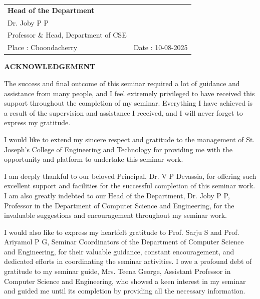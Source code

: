 \begin{tabular*}{\textwidth}{@{\extracolsep{\fill}} ll}
\textbf{Head of the Department} & \\
Dr. Joby P P & \\
Professor \& Head, Department of CSE & \\
Place : Choondacherry & Date : 10-08-2025
\end{tabular*}

\newpage
\thispagestyle{empty}
\begin{center}
  \vspace*{1cm}
  \textbf{\large ACKNOWLEDGEMENT}
\end{center}
The success and final outcome of this seminar required a lot of guidance and assistance from
many people, and I feel extremely privileged to have received this support throughout the
completion of my seminar. Everything I have achieved is a result of the supervision and
assistance I received, and I will never forget to express my gratitude.

\vspace{-0.3cm}

I would like to extend my sincere respect and gratitude to the management of St. Joseph’s
College of Engineering and Technology for providing me with the opportunity and platform
to undertake this seminar work.

\vspace{-0.3cm}

I am deeply thankful to our beloved Principal, Dr. V P Devassia, for offering such excellent
support and facilities for the successful completion of this seminar work.
I am also greatly indebted to our Head of the Department, Dr. Joby P P, Professor in the Department of Computer Science and Engineering, for the invaluable suggestions and encouragement throughout my seminar work.

\vspace{-0.3cm}

I would also like to express my heartfelt gratitude to Prof. Sarju S and Prof. Ariyamol P G, Seminar Coordinators of the Department of Computer Science and Engineering, for their valuable guidance, constant encouragement, and dedicated efforts in coordinating the seminar activities. I owe a profound debt of gratitude to my seminar guide, Mrs. Teena George,
Assistant Professor in Computer Science and Engineering,
who showed a keen interest in my seminar and guided me until its completion by providing
all the necessary information.

